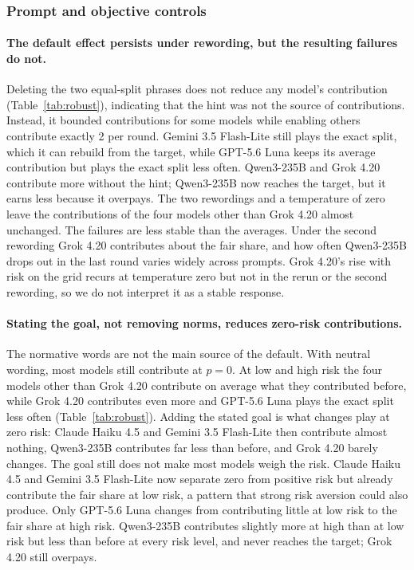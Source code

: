 \documentclass[sigconf,anonymous]{aamas}
\begin{document}
\subsubsection{Prompt and objective controls}
\label{sec:controls}

\paragraph{The default effect persists under rewording, but the resulting failures do not.}
Deleting the two equal-split phrases does not reduce any model’s contribution (Table~\ref{tab:robust}), indicating that the hint was not the source of contributions. Instead, it bounded contributions for some models while enabling others contribute exactly 2 per round. Gemini 3.5 Flash-Lite still plays the exact split, which it can rebuild from the target, while GPT-5.6 Luna keeps its average  contribution but plays the exact split less often. Qwen3-235B and Grok 4.20 contribute more without the hint; Qwen3-235B now reaches the target, but it earns less because it overpays. The two rewordings and a temperature of zero leave the contributions of the four models other than Grok 4.20 almost unchanged. The failures are less stable than the averages. Under the second rewording Grok 4.20 contributes  about the fair share, and how often Qwen3-235B drops out in the last round varies widely across prompts. Grok 4.20's rise with risk on the grid recurs at temperature zero but not in the rerun or the second rewording, so we do not interpret it as a stable response.

\paragraph{Stating the goal, not removing norms, reduces  zero-risk contributions.}
The normative words are not the main source of the default. With neutral wording, most models still contribute at $p=0$. At low and high risk the four models other than Grok 4.20 contribute on average what they contributed before, while Grok 4.20 contributes  even more and GPT-5.6 Luna plays the exact split less often (Table~\ref{tab:robust}). Adding the stated goal is what changes play at zero risk: Claude Haiku 4.5 and Gemini 3.5 Flash-Lite then contribute almost nothing, Qwen3-235B contributes  far less than before, and Grok 4.20 barely changes. The goal still does not make most models weigh the risk. Claude Haiku 4.5 and Gemini 3.5 Flash-Lite now separate zero from positive risk but already contribute the fair share at low risk, a pattern that strong risk aversion could also produce. Only GPT-5.6 Luna changes from contributing  little at low risk to the fair share at high risk. Qwen3-235B contributes  slightly more at high than at low risk but less than before at every risk level, and never reaches the target; Grok 4.20 still overpays. 
\end{document}
